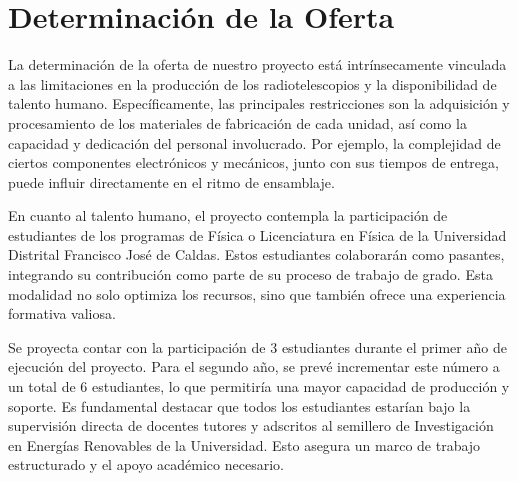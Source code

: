 \section{Determinación de la Oferta}%
\label{sec:Determinación de la Oferta}

La determinación de la oferta de nuestro proyecto está intrínsecamente
vinculada a las limitaciones en la producción de los radiotelescopios y la
disponibilidad de talento humano.
Específicamente, las principales restricciones son la adquisición y
procesamiento de los materiales de fabricación de cada unidad, así como la
capacidad y dedicación del personal involucrado.
Por ejemplo, la complejidad de ciertos componentes electrónicos y mecánicos,
junto con sus tiempos de entrega, puede influir directamente en el ritmo de
ensamblaje.

En cuanto al talento humano, el proyecto contempla la participación de
estudiantes de los programas de Física o Licenciatura en Física de la
Universidad Distrital Francisco José de Caldas.
Estos estudiantes colaborarán como pasantes, integrando su contribución como
parte de su proceso de trabajo de grado.
Esta modalidad no solo optimiza los recursos, sino que también ofrece una
experiencia formativa valiosa.

Se proyecta contar con la participación de 3 estudiantes durante el primer
año de ejecución del proyecto.
Para el segundo año, se prevé incrementar este número a un total de 6
estudiantes, lo que permitiría una mayor capacidad de producción y soporte.
Es fundamental destacar que todos los estudiantes estarían bajo la supervisión
directa de docentes tutores y adscritos al semillero de Investigación en
Energías Renovables de la Universidad.
Esto asegura un marco de trabajo estructurado y el apoyo académico necesario.
